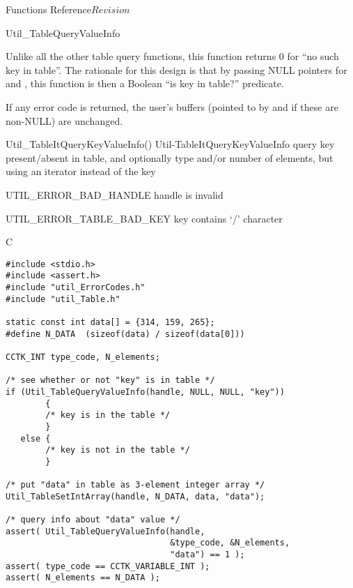 \begin{cactuspart}{ Functions Reference}{}{$Revision$}
\begin{FunctionDescription}{Util\_TableQueryValueInfo}
\begin{Discussion}
Unlike all the other table query functions, this function returns
0 for ``no such key in table''.  The rationale for this design is that
by passing NULL pointers for  and , this
function is then a Boolean ``is key in table?'' predicate.

If any error code is returned, the user's buffers (pointed to by
 and  if these are non-NULL) are
unchanged.
\end{Discussion}

\begin{SeeAlsoSection}
\begin{SeeAlso2} {Util\_TableItQueryKeyValueInfo()} {Util-TableItQueryKeyValueInfo}
query key present/absent in table, and optionally type and/or number
of elements, but using an iterator instead of the key
\end{SeeAlso2}
\end{SeeAlsoSection}

\begin{ErrorSection}
\begin{Error}{UTIL\_ERROR\_BAD\_HANDLE}
handle is invalid
\end{Error}
\begin{Error}{UTIL\_ERROR\_TABLE\_BAD\_KEY}
key contains `/' character
\end{Error}
\end{ErrorSection}

\begin{ExampleSection}
\begin{Example}{C}
\begin{verbatim}
#include <stdio.h>
#include <assert.h>
#include "util_ErrorCodes.h"
#include "util_Table.h"

static const int data[] = {314, 159, 265};
#define N_DATA  (sizeof(data) / sizeof(data[0]))

CCTK_INT type_code, N_elements;

/* see whether or not "key" is in table */
if (Util_TableQueryValueInfo(handle, NULL, NULL, "key"))
        {
        /* key is in the table */
        }
   else {
        /* key is not in the table */
        }

/* put "data" in table as 3-element integer array */
Util_TableSetIntArray(handle, N_DATA, data, "data");

/* query info about "data" value */
assert( Util_TableQueryValueInfo(handle,
                                 &type_code, &N_elements,
                                 "data") == 1 );
assert( type_code == CCTK_VARIABLE_INT );
assert( N_elements == N_DATA );
\end{verbatim}
\end{Example}
\end{ExampleSection}
\end{FunctionDescription}


\end{cactuspart}
